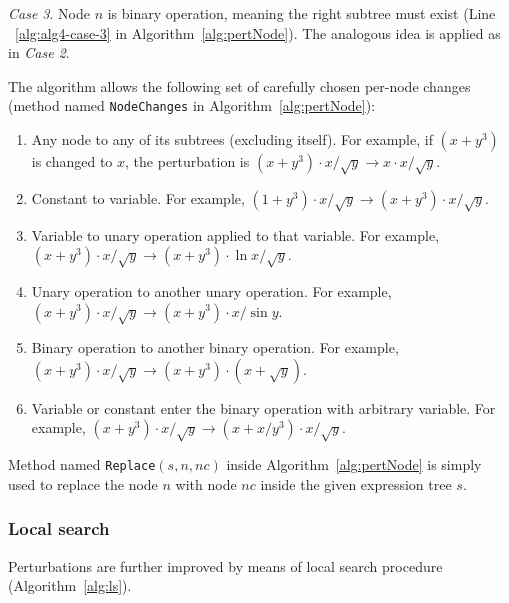 \documentclass{bmcart}
\begin{document}
\emph{Case 3}. 
Node $n$ is binary operation, meaning the right subtree must exist (Line ~\ref{alg:alg4-case-3} in Algorithm~\ref{alg:pertNode}). 
The analogous idea is applied as in \emph{Case 2}. 

The algorithm allows the following set of carefully chosen per-node changes (method named \texttt{NodeChanges} in Algorithm~\ref{alg:pertNode}): 

\begin{enumerate}
	\item Any node to any of its subtrees (excluding itself). For example, if $(x+y^3)$ is changed to $x$, the perturbation is $(x+y^3)\cdot x/\sqrt{y} \rightarrow x\cdot x/\sqrt{y}$. 
	\item Constant to variable. For example,  $(1+y^3)\cdot x/\sqrt{y} \rightarrow (x+y^3)\cdot x/\sqrt{y}$.
	\item Variable to unary operation applied to that variable. For example,  $(x+y^3)\cdot x/\sqrt{y} \rightarrow (x+y^3)\cdot \ln{x}/\sqrt{y}$.
	\item Unary operation to another unary operation. For example,  $(x+y^3)\cdot x/\sqrt{y} \rightarrow (x+y^3)\cdot x/\sin{y}$.
	\item Binary operation to another binary operation. For example,  $(x+y^3)\cdot x/\sqrt{y} \rightarrow (x+y^3)\cdot (x + \sqrt{y})$. 
	\item Variable or constant enter the binary operation with arbitrary variable. For example,  $(x+y^3)\cdot x/\sqrt{y} \rightarrow (x+x/y^3)\cdot x/\sqrt{y}$. 
\end{enumerate}

Method named \texttt{Replace}$(s, n, nc)$ inside Algorithm~\ref{alg:pertNode} is simply used to replace the node $n$ with node $nc$ inside the given expression tree $s$.   

\subsubsection{Local search}\label{sec:ls}

Perturbations are further improved by means of local search procedure (Algorithm~\ref{alg:ls}). 
\end{document}
